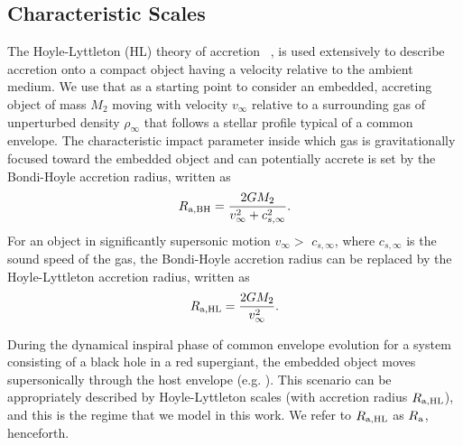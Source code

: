 \subsection{Characteristic Scales}
The Hoyle-Lyttleton (HL) theory of accretion ~\cite{1939PCPS...35..405H,1944MNRAS.104..273B,Edgar:2004}, is used extensively to describe accretion onto a compact object having a velocity relative to the ambient medium. We use that as a starting point to consider an embedded, accreting object of mass $M_2$ moving with velocity $v_{\infty}$ relative to a surrounding gas of unperturbed density $\rho_\infty$ that follows a stellar profile typical of a common envelope. The characteristic impact parameter inside which gas is gravitationally focused toward the embedded object and can potentially accrete is set by the Bondi-Hoyle accretion radius, written as
\begin{equation}
R_{\rm{a, BH}} = \frac{2GM_2}{v_{\infty}^{2} + c_{s, \infty}^{2}}.
\end{equation}
For an object in significantly supersonic motion $v_{\infty} >$ $c_{s, \infty}$, where $c_{s, \infty}$ is the sound speed of the gas, the Bondi-Hoyle accretion radius can be replaced by the Hoyle-Lyttleton accretion radius, written as
\begin{equation}
R_{\rm{a, HL}} = \frac{2GM_2}{v_{\infty}^{2}}.
\end{equation}

During the dynamical inspiral phase of common envelope evolution for a system consisting of a black hole in a red supergiant, the embedded object moves supersonically through the host envelope (e.g. \cite{MacLeod_2015}). This scenario can be appropriately described by Hoyle-Lyttleton scales (with accretion radius $R_{\rm a, HL}$), and this is the regime that we model in this work. We refer to $R_{\rm a, HL}$ as $R_{\rm a}$, henceforth.

